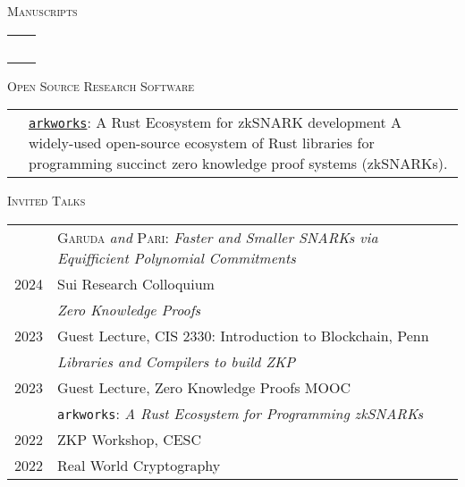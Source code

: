 \documentclass[11pt]{article}
\newenvironment{SectionTable}[1]{
	\renewcommand*{\arraystretch}{1.7}
	\setlength{\tabcolsep}{6pt}
  {\Large \textsc{#1}}
	\begin{longtable}{Rp{5.4in}}}
{\end{longtable}\vspace{-0.2cm}}
\newenvironment{SectionTableSingleSpace}[1]{
	\renewcommand*{\arraystretch}{1.2}
	\setlength{\tabcolsep}{6pt}
  {\Large \textsc{#1}}
	\begin{longtable}{Rp{5.4in}}}
{\end{longtable}\vspace{-0.2cm}}
\begin{document}
\begin{cv}{\vspace{-5em}}
  \clearpage
  \begin{refsection}
    \newrefcontext[labelprefix=P] %
    \begin{SectionTable}{Manuscripts}
      \cite{BawejaMMS25} &  \\
      \cite{BawejaMMNW24} &  \\
      \cite{BunzMNW24b} &  \\
      \cite{DellepereMS24} &  \\
      \cite{FalkMS24} &  \\
    \end{SectionTable}
    \newsavebox\preprintbib
    \savebox{}
  \end{refsection}
  
  \begin{SectionTable}{Open Source Research Software}
    & 
    \href{https://github.com/arkworks-rs}{\texttt{arkworks}}: A Rust Ecosystem for zkSNARK development \newline
    A widely-used open-source ecosystem of Rust libraries for programming succinct zero knowledge proof systems (zkSNARKs).
  \end{SectionTable}
  
  \begin{SectionTableSingleSpace}{Invited Talks}
    & \textsc{Garuda} \emph{and} \textsc{Pari}: \emph{Faster and Smaller SNARKs via Equifficient Polynomial Commitments}\\
    2024 & Sui Research Colloquium\\[0.4em]

    & \emph{Zero Knowledge Proofs} \\
    2023 & Guest Lecture, CIS 2330: Introduction to Blockchain, Penn\\[0.4em]
    
    & \emph{Libraries and Compilers to build ZKP}\\
    2023 & Guest Lecture, Zero Knowledge Proofs MOOC\\[0.4em]

    & \texttt{arkworks}: \emph{A Rust Ecosystem for Programming zkSNARKs} \\
    2022 & ZKP Workshop, CESC \\
    2022 & Real World Cryptography \\[0.4em]


\end{SectionTableSingleSpace}
\end{cv}
\end{document}
